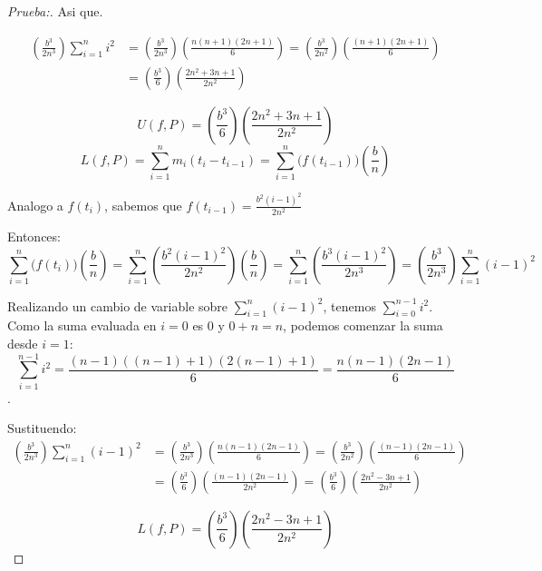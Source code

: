 \documentclass[12pt]{article}
\begin{document}
\begin{enumerate}[\hspace{9px} a)]
\begin{proof}[Prueba:]
        Asi que.

        \begin{align*}
            \left(\frac{b^3}{2n^3}\right) \sum_{i=1}^n i^2 &= \left(\frac{b^3}{2n^3}\right)\left(\frac{n(n+1)(2n+1)}{6}\right) = \left(\frac{b^3}{2n^2}\right)\left(\frac{(n+1)(2n+1)}{6}\right) \\
            &= \left(\frac{b^3}{6}\right)\left(\frac{2n^2+3n+1}{2n^2}\right)
        \end{align*}

        \[U(f,P)=\left(\frac{b^3}{6}\right)\left(\frac{2n^2+3n+1}{2n^2}\right)\]
        \begin{equation*}
            L(f,P)=\sum_{i=1}^n m_i(t_i-t_{i-1}) = \sum_{i=1}^n \big(f(t_{i-1})\big)\left(\displaystyle\frac{b}{n}\right)
        \end{equation*}

        Analogo a \(f(t_i)\), sabemos que \(f(t_{i-1})=\displaystyle\frac{b^2(i-1)^2}{2n^2}\)

        Entonces:
        \begin{equation*}
            \sum_{i=1}^n \big(f(t_i)\big)\left(\displaystyle\frac{b}{n}\right) = \sum_{i=1}^n \left(\frac{b^2(i-1)^2}{2n^2}\right)\left(\displaystyle\frac{b}{n}\right) = \sum_{i=1}^n \left(\frac{b^3(i-1)^2}{2n^3}\right) = \left(\frac{b^3}{2n^3}\right) \sum_{i=1}^n (i-1)^2
        \end{equation*}

        Realizando un cambio de variable sobre \(\sum_{i=1}^n (i-1)^2\), tenemos \(\sum_{i=0}^{n-1} i^2\). Como la suma evaluada en $i=0$ es 0 y \(0+n=n\), podemos comenzar la suma desde \(i=1\): \[\sum_{i=1}^{n-1} i^2 = \displaystyle\frac{(n-1)((n-1)+1)(2(n-1)+1)}{6} = \frac{n(n-1)(2n-1)}{6}\].

        Sustituendo:
        \begin{align*}
            \left(\frac{b^3}{2n^3}\right)\sum_{i=1}^n (i-1)^2 &= \left(\frac{b^3}{2n^3}\right)\left(\frac{n(n-1)(2n-1)}{6}\right) = \left(\frac{b^3}{2n^2}\right)\left(\frac{(n-1)(2n-1)}{6}\right) \\ 
            &= \left(\frac{b^3}{6}\right)\left(\frac{(n-1)(2n-1)}{2n^2}\right) = \left(\frac{b^3}{6}\right)\left(\frac{2n^2-3n+1}{2n^2}\right)
        \end{align*}

        \[L(f,P)=\left(\frac{b^3}{6}\right)\left(\frac{2n^2-3n+1}{2n^2}\right)\]
        

\end{proof}
\end{enumerate}
\end{document}
